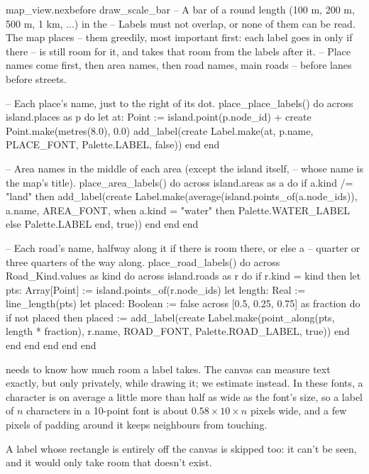 \begin{addbefore}{map_view.nex}{before draw_scale_bar}{  -- A bar of a round length (100 m, 200 m, 500 m, 1 km, ...) in the}
  -- Labels must not overlap, or none of them can be read. The map places
  -- them greedily, most important first: each label goes in only if there
  -- is still room for it, and takes that room from the labels after it.
  -- Place names come first, then area names, then road names, main roads
  -- before lanes before streets.

  -- Each place's name, just to the right of its dot.
  place_place_labels() do
    across island.places as p do
      let at: Point := island.point(p.node_id) + create Point.make(metres(8.0), 0.0)
      add_label(create Label.make(at, p.name, PLACE_FONT, Palette.LABEL, false))
    end
  end

  -- Area names in the middle of each area (except the island itself,
  -- whose name is the map's title).
  place_area_labels() do
    across island.areas as a do
      if a.kind /= "land" then
        add_label(create Label.make(average(island.points_of(a.node_ids)), a.name,
          AREA_FONT, when a.kind = "water" then Palette.WATER_LABEL else Palette.LABEL end,
          true))
      end
    end
  end

  -- Each road's name, halfway along it if there is room there, or else a
  -- quarter or three quarters of the way along.
  place_road_labels() do
    across Road_Kind.values as kind do
      across island.roads as r do
        if r.kind = kind then
          let pts: Array[Point] := island.points_of(r.node_ids)
          let length: Real := line_length(pts)
          let placed: Boolean := false
          across [0.5, 0.25, 0.75] as fraction do
            if not placed then
              placed := add_label(create Label.make(point_along(pts, length * fraction),
                r.name, ROAD_FONT, Palette.ROAD_LABEL, true))
            end
          end
        end
      end
    end
  end
\end{addbefore}

 needs to know how much room a label takes. The canvas can
measure text exactly, but only privately, while drawing it; we estimate
instead. In these fonts, a character is on average a little more than half
as wide as the font's size, so a label of $n$ characters in a 10-point font
is about $0.58 \times 10 \times n$ pixels wide, and a few pixels of padding
around it keeps neighbours from touching.

A label whose rectangle is entirely off the canvas is skipped too: it
can't be seen, and it would only take room that doesn't exist.

